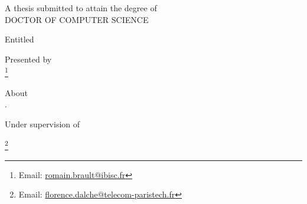 
\begin{titlepage}

\renewcommand*{\thefootnote}{\fnsymbol{footnote}}
\begin{addmargin}[-1cm]{-3cm}
\begin{center}
\large

\hfill
\vfill

\begingroup
A thesis submitted to attain the degree of \\ \bigskip
{\Huge \color{Maroon} DOCTOR OF COMPUTER SCIENCE}
\endgroup

\vfill

\begingroup
Entitled \\ \bigskip
{\Huge \color{Maroon}\spacedallcaps{\myTitle}}
\endgroup

\vfill

Presented by \\ \bigskip
{\Large\textbf{\spacedlowsmallcaps{\myName}}}\footnote{Email: \href{mailto:romain.brault@ibisc.fr}{romain.brault@ibisc.fr}} %

\vfill

\begingroup
About \\ \bigskip
{\Large \textbf{\spacedlowsmallcaps{\mySubtitle}}}. %
\endgroup

\vfill

\noindent Under supervision of
\par
\mySupervisorDegree \spacedlowsmallcaps{\mySupervisor}\footnote{Email: \href{mailto:florence.dalche@telecom-paristech.fr}{florence.dalche@telecom-paristech.fr}}

\vfill


\end{center}
\end{addmargin}
\end{titlepage}
